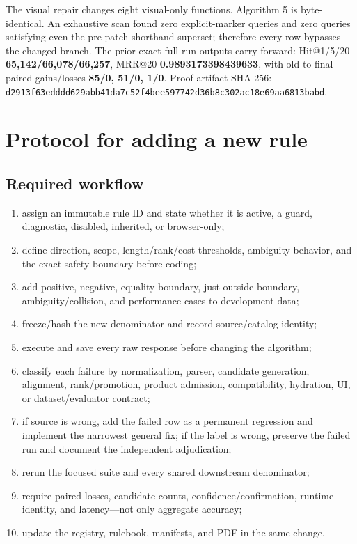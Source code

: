 \documentclass[10pt,oneside]{book}
\begin{document}
The visual repair changes eight visual-only functions. Algorithm 5 is
byte-identical. An exhaustive scan found zero explicit-marker queries and zero
queries satisfying even the pre-patch shorthand superset; therefore every row
bypasses the changed branch. The prior exact full-run outputs carry forward:
Hit@1/5/20 \textbf{65,142/66,078/66,257}, MRR@20
\textbf{0.9893173398439633}, with old-to-final paired gains/losses
\textbf{85/0, 51/0, 1/0}. Proof artifact SHA-256:
\texttt{d2913f63edddd629abb41da7c52f4bee597742d36b8c302ac18e69aa6813babd}.

\chapter{Protocol for adding a new rule}

\section{Required workflow}

\begin{enumerate}
\item assign an immutable rule ID and state whether it is active, a guard,
diagnostic, disabled, inherited, or browser-only;
\item define direction, scope, length/rank/cost thresholds, ambiguity behavior,
and the exact safety boundary before coding;
\item add positive, negative, equality-boundary, just-outside-boundary,
ambiguity/collision, and performance cases to development data;
\item freeze/hash the new denominator and record source/catalog identity;
\item execute and save every raw response before changing the algorithm;
\item classify each failure by normalization, parser, candidate generation,
alignment, rank/promotion, product admission, compatibility, hydration, UI, or
dataset/evaluator contract;
\item if source is wrong, add the failed row as a permanent regression and
implement the narrowest general fix; if the label is wrong, preserve the failed
run and document the independent adjudication;
\item rerun the focused suite and every shared downstream denominator;
\item require paired losses, candidate counts, confidence/confirmation,
runtime identity, and latency---not only aggregate accuracy;
\item update the registry, rulebook, manifests, and PDF in the same change.
\end{enumerate}
\end{document}
